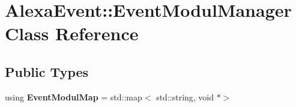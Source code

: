 \hypertarget{classAlexaEvent_1_1EventModulManager}{}\section{Alexa\+Event\+:\+:Event\+Modul\+Manager Class Reference}
\label{classAlexaEvent_1_1EventModulManager}
\subsection*{Public Types}
\begin{DoxyCompactItemize}
\item 
\mbox{\label{classAlexaEvent_1_1EventModulManager_a620b62f6e2e5871f020fcf21b1bb1a6f}} 
using {\bfseries Event\+Modul\+Map} = std\+::map$<$ std\+::string, void $\ast$$>$
\end{DoxyCompactItemize}

